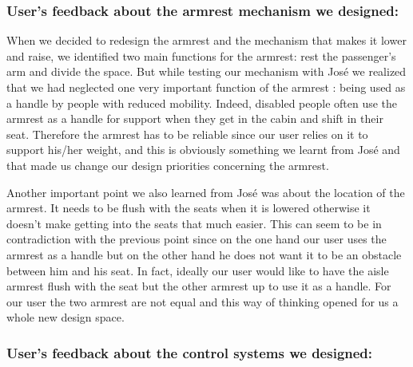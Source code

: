 \subsubsection*{User's feedback about the armrest mechanism we designed:}

When we decided to redesign the armrest and the mechanism that makes it lower and raise, we identified two main functions for the armrest: rest the passenger's arm and divide the space. But while testing our mechanism with José we realized that we had neglected one very important function of the armrest : being used as a handle by people with reduced mobility. Indeed, disabled people often use the armrest as a handle for support when they get in the cabin and shift in their seat. Therefore the armrest has to be reliable since our user relies on it to support his/her weight, and this is obviously something we learnt from José and that made us change our design priorities concerning the armrest.

Another important point we also learned from José was about the location of the armrest. It needs to be flush with the seats when it is lowered otherwise it doesn't make getting into the seats that much easier. This can seem to be in contradiction with the previous point since on the one hand our user uses the armrest as a handle but on the other hand he does not want it to be an obstacle between him and his seat. In fact, ideally our user would like to have the aisle armrest flush with the seat but the other armrest up to use it as a handle. For our user the two armrest are not equal and this way of thinking opened for us a whole new design space. 


\subsubsection*{User's feedback about the control systems we designed:}

